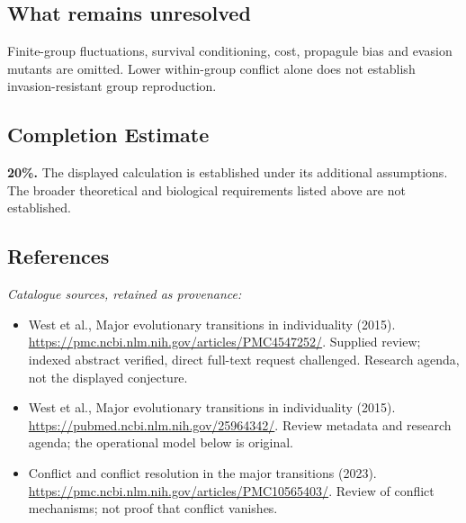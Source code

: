 \documentclass[11pt]{article}
\begin{document}
\subsection{What remains unresolved}
Finite-group fluctuations, survival conditioning, cost, propagule bias and evasion mutants are omitted. Lower within-group conflict alone does not establish invasion-resistant group reproduction.
\subsection{Completion Estimate}
\textbf{20\%.} The displayed calculation is established under its additional assumptions. The broader theoretical and biological requirements listed above are not established.
\subsection{References}
\noindent\emph{Catalogue sources, retained as provenance:}
\begin{itemize}
\item West et al., Major evolutionary transitions in individuality (2015). \url{https://pmc.ncbi.nlm.nih.gov/articles/PMC4547252/}. Supplied review; indexed abstract verified, direct full-text request challenged. Research agenda, not the displayed conjecture.
\item West et al., Major evolutionary transitions in individuality (2015). \url{https://pubmed.ncbi.nlm.nih.gov/25964342/}. Review metadata and research agenda; the operational model below is original.
\item Conflict and conflict resolution in the major transitions (2023). \url{https://pmc.ncbi.nlm.nih.gov/articles/PMC10565403/}. Review of conflict mechanisms; not proof that conflict vanishes.
\end{itemize}
\clearpage


\appendix
\end{document}
